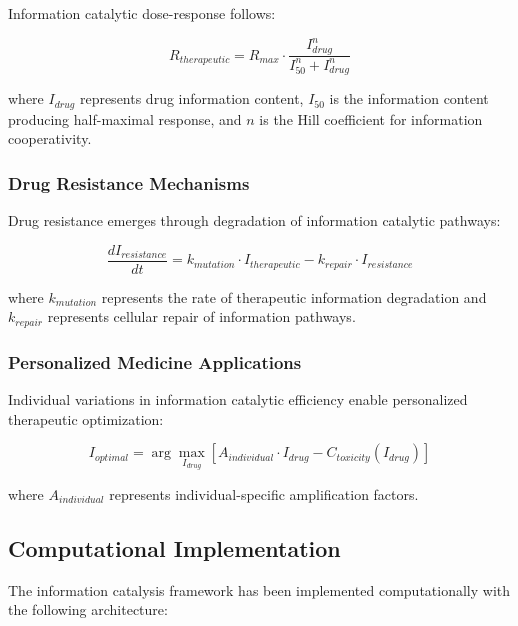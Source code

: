 \documentclass[12pt,a4paper]{article}
\begin{document}
Information catalytic dose-response follows:

\begin{equation}
R_{therapeutic} = R_{max} \cdot \frac{I_{drug}^n}{I_{50}^n + I_{drug}^n}
\end{equation}

where $I_{drug}$ represents drug information content, $I_{50}$ is the information content producing half-maximal response, and $n$ is the Hill coefficient for information cooperativity.

\subsubsection{Drug Resistance Mechanisms}

Drug resistance emerges through degradation of information catalytic pathways:

\begin{equation}
\frac{dI_{resistance}}{dt} = k_{mutation} \cdot I_{therapeutic} - k_{repair} \cdot I_{resistance}
\end{equation}

where $k_{mutation}$ represents the rate of therapeutic information degradation and $k_{repair}$ represents cellular repair of information pathways.

\subsubsection{Personalized Medicine Applications}

Individual variations in information catalytic efficiency enable personalized therapeutic optimization:

\begin{equation}
I_{optimal} = \arg\max_{I_{drug}} \left[ A_{individual} \cdot I_{drug} - C_{toxicity}(I_{drug}) \right]
\end{equation}

where $A_{individual}$ represents individual-specific amplification factors.

\subsection{Computational Implementation}

The information catalysis framework has been implemented computationally with the following architecture:
\end{document}
